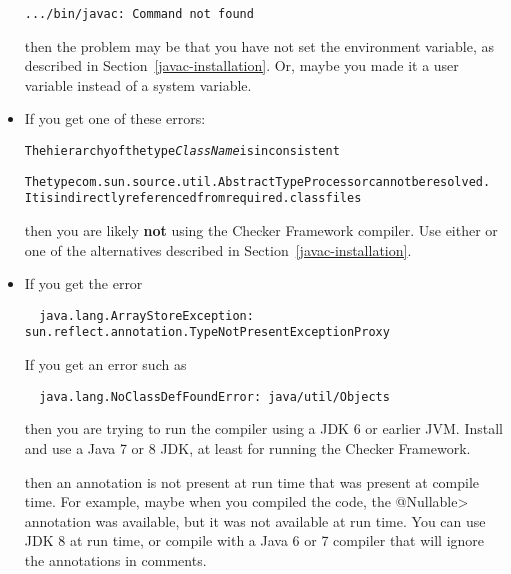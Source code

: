 \begin{itemize}
\begin{smaller}
\begin{Verbatim}
.../bin/javac: Command not found
\end{Verbatim}
\end{smaller}

\noindent
then the problem may be that you have not set the  environment
variable, as described in Section~\ref{javac-installation}.  Or, maybe
you made it a user variable instead of a system variable.

\item
If you get one of these errors:

\begin{alltt}
The hierarchy of the type \emph{ClassName} is inconsistent

The type com.sun.source.util.AbstractTypeProcessor cannot be resolved.
  It is indirectly referenced from required .class files
\end{alltt}

\begin{sloppypar}
\noindent
then you are likely \textbf{not} using the Checker Framework compiler.  Use
either  or one of the alternatives
described in Section~\ref{javac-installation}.
\end{sloppypar}


\item
If you get the error

\begin{Verbatim}
  java.lang.ArrayStoreException: sun.reflect.annotation.TypeNotPresentExceptionProxy
\end{Verbatim}

\noindent
If you get an error such as

\begin{Verbatim}
  java.lang.NoClassDefFoundError: java/util/Objects
\end{Verbatim}

\noindent
then you are trying to run the compiler using a JDK 6 or earlier JVM\@.
Install and use a Java 7 or 8 JDK, at least for running the Checker
Framework.

\noindent
then an annotation is not present at run time that was present at compile
time.  For example, maybe when you compiled the code, the \<@Nullable>
annotation was available, but it was not available at run time.
You can use JDK 8 at run time, or compile
with a Java 6 or 7 compiler that will ignore the annotations in comments.


\end{itemize}

